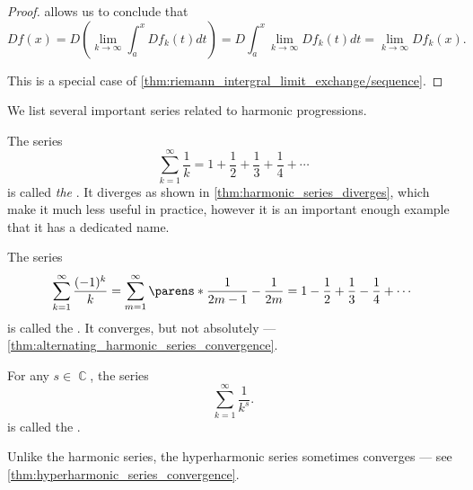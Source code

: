 \begin{proof}
   allows us to conclude that
  \begin{equation*}
    D f(x)
    =
    D\left(\lim_{k \to \infty} \int_a^x D f_k(t) dt \right)
    =
    D \int_a^x \lim_{k \to \infty} D f_k(t) dt
    =
    \lim_{k \to \infty} D f_k(x).
  \end{equation*}

   This is a special case of \cref{thm:riemann_intergral_limit_exchange/sequence}.
\end{proof}

\begin{example}\label{ex:harmonic_series}
  We list several important series related to harmonic progressions.

  \begin{thmenum}
     The series
    \begin{equation}\label{eq:ex:harmonic_series/harmonic}
      \sum_{k=1}^\infty \frac 1 k = 1 + \frac 1 2 + \frac 1 3 + \frac 1 4 + \cdots
    \end{equation}
    is called \emph{the} . It diverges as shown in \cref{thm:harmonic_series_diverges}, which make it much less useful in practice, however it is an important enough example that it has a dedicated name.

     The series
    \begin{equation}\label{eq:ex:harmonic_series/alternating}
      \sum_{k=1}^\infty \frac {(-1)^k} k
      =
      \sum_{m=1}^\infty \parens*{ \frac 1 {2m - 1} - \frac 1 {2m} }
      =
      1 - \frac 1 2 + \frac 1 3 - \frac 1 4 + \cdots
    \end{equation}
    is called the . It converges, but not absolutely --- \cref{thm:alternating_harmonic_series_convergence}.

     For any \( s \in \BbbC \), the series
    \begin{equation}\label{eq:ex:harmonic_series/hyperharmonic}
      \sum_{k=1}^\infty \frac 1 {k^s}.
    \end{equation}
    is called the .

    Unlike the harmonic series, the hyperharmonic series sometimes converges --- see \cref{thm:hyperharmonic_series_convergence}.
  \end{thmenum}
\end{example}


